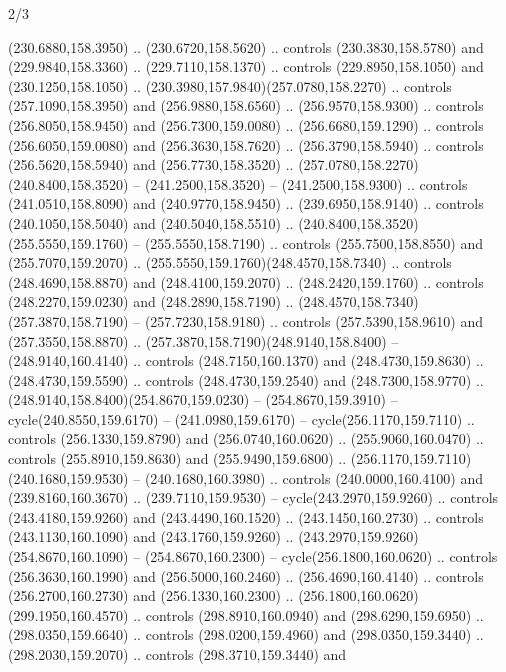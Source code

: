 \begin{flagdescription}{2/3}
\begin{scope}[xshift=0.5\flaglength,yshift=0.5\flagwidth,scale=\flagwidth/259.2]
\begin{scope}[y=0.8pt, x=0.8pt, yscale=-1,shift={(-243,-162)}]
      (230.6880,158.3950) .. (230.6720,158.5620) .. controls (230.3830,158.5780) and
      (229.9840,158.3360) .. (229.7110,158.1370) .. controls (229.8950,158.1050) and
      (230.1250,158.1050) .. (230.3980,157.9840)(257.0780,158.2270) .. controls
      (257.1090,158.3950) and (256.9880,158.6560) .. (256.9570,158.9300) .. controls
      (256.8050,158.9450) and (256.7300,159.0080) .. (256.6680,159.1290) .. controls
      (256.6050,159.0080) and (256.3630,158.7620) .. (256.3790,158.5940) .. controls
      (256.5620,158.5940) and (256.7730,158.3520) ..
      (257.0780,158.2270)(240.8400,158.3520) -- (241.2500,158.3520) --
      (241.2500,158.9300) .. controls (241.0510,158.8090) and (240.9770,158.9450) ..
      (239.6950,158.9140) .. controls (240.1050,158.5040) and (240.5040,158.5510) ..
      (240.8400,158.3520)(255.5550,159.1760) -- (255.5550,158.7190) .. controls
      (255.7500,158.8550) and (255.7070,159.2070) ..
      (255.5550,159.1760)(248.4570,158.7340) .. controls (248.4690,158.8870) and
      (248.4100,159.2070) .. (248.2420,159.1760) .. controls (248.2270,159.0230) and
      (248.2890,158.7190) .. (248.4570,158.7340)(257.3870,158.7190) --
      (257.7230,158.9180) .. controls (257.5390,158.9610) and (257.3550,158.8870) ..
      (257.3870,158.7190)(248.9140,158.8400) -- (248.9140,160.4140) .. controls
      (248.7150,160.1370) and (248.4730,159.8630) .. (248.4730,159.5590) .. controls
      (248.4730,159.2540) and (248.7300,158.9770) ..
      (248.9140,158.8400)(254.8670,159.0230) -- (254.8670,159.3910) --
      cycle(240.8550,159.6170) -- (241.0980,159.6170) -- cycle(256.1170,159.7110) ..
      controls (256.1330,159.8790) and (256.0740,160.0620) .. (255.9060,160.0470) ..
      controls (255.8910,159.8630) and (255.9490,159.6800) ..
      (256.1170,159.7110)(240.1680,159.9530) -- (240.1680,160.3980) .. controls
      (240.0000,160.4100) and (239.8160,160.3670) .. (239.7110,159.9530) --
      cycle(243.2970,159.9260) .. controls (243.4180,159.9260) and
      (243.4490,160.1520) .. (243.1450,160.2730) .. controls (243.1130,160.1090) and
      (243.1760,159.9260) .. (243.2970,159.9260)(254.8670,160.1090) --
      (254.8670,160.2300) -- cycle(256.1800,160.0620) .. controls
      (256.3630,160.1990) and (256.5000,160.2460) .. (256.4690,160.4140) .. controls
      (256.2700,160.2730) and (256.1330,160.2300) ..
      (256.1800,160.0620)(299.1950,160.4570) .. controls (298.8910,160.0940) and
      (298.6290,159.6950) .. (298.0350,159.6640) .. controls (298.0200,159.4960) and
      (298.0350,159.3440) .. (298.2030,159.2070) .. controls (298.3710,159.3440) and

\end{scope}
\end{scope}
\end{flagdescription}
